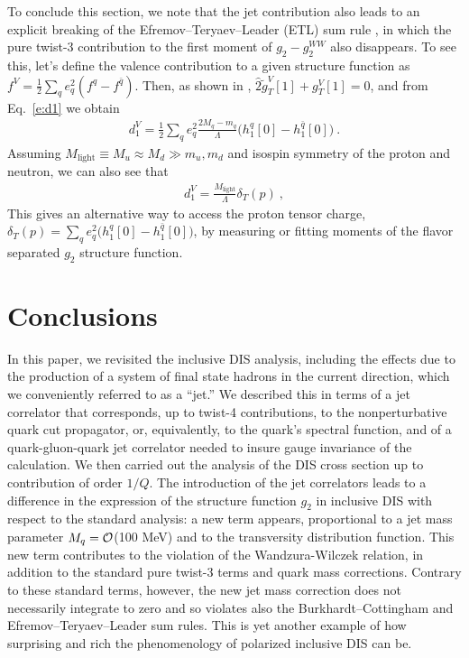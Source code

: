 \documentclass[preprintnumbers,floatfix,nofootinbib]{revtex4}
\def\AAcom#1{{\bf  \textcolor{Red}{[AA: {#1}]}}}
\newcommand{\mj}{M_q}
\newcommand{\mq}{m_q}
\begin{document}
To conclude this section, we note that the jet contribution also leads to an explicit breaking of the Efremov--Teryaev--Leader (ETL) sum rule \cite{Efremov:1996hd}, in which the pure twist-3 contribution to the first moment of $g_2-g_2^{WW}$ also disappears. To see this, let's define the valence contribution to a given structure function as $f^V=\frac12\sum_q e_q^2 (f^q-f^{\bar q})$. Then, as shown in \cite{Efremov:1996hd}, $\widehat 2\tilde g_T^V[1] + g_T^V[1]  = 0$, and from Eq.~\eqref{e:d1} we obtain
\begin{align}
  d_1^V = \frac12 \sum_q e_q^2 \frac{2\mj- \mq}{\Lambda} 
    \big(h_1^{q}[0]-h_1^{\bar q}[0]\big) \ .
\end{align}
Assuming $M_\text{light}\equiv M_u \approx M_d \gg m_u , m_d$ and isospin symmetry of the proton and neutron, we can also see that 
\begin{align}
  d_1^V = \frac{M_{\text{light}}}{\Lambda} \delta_T(p) \ ,   
\end{align}
This gives an alternative way to access the proton tensor charge, $\delta_T(p) = \sum_q e_q^2 \big(h_1^{q}[0]-h_1^{\bar q}[0]\big)$, by measuring or fitting moments of the flavor separated $g_2$ structure function.





\section{Conclusions}

In this paper, we revisited the inclusive DIS analysis, including the
effects due to the production of a system of final state hadrons in the current direction, which we
conveniently referred to as a ``jet.'' We described this in terms of a jet
correlator that corresponds, up to twist-4 contributions, to the nonperturbative quark cut propagator, or, equivalently, to the quark's spectral function, and of a quark-gluon-quark jet correlator needed to insure gauge invariance of the calculation.
We then carried out the analysis of 
the DIS cross section up to contribution of order $1/Q$. 
The introduction of the jet correlators 
leads to a difference in the expression of the structure function $g_2$ in
inclusive DIS with respect to the standard analysis: a new term appears, proportional to a jet mass parameter $\mj={\cal O}$(100 MeV)
and to the transversity distribution function. This new term
contributes to the violation of the Wandzura-Wilczek relation, in addition to
the standard pure twist-3 terms and quark mass corrections. Contrary to these
standard terms, however, the new jet mass correction does not necessarily integrate to zero and so violates also the
Burkhardt--Cottingham and Efremov--Teryaev--Leader sum rules. This is yet another example of how surprising
and rich the phenomenology of polarized inclusive DIS can be. 
\end{document}
